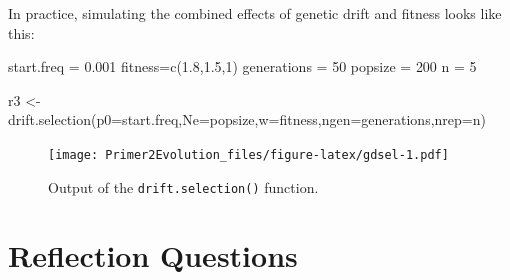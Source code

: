 \documentclass[
]{book}
\newenvironment{Shaded}{\begin{snugshade}}{\end{snugshade}}
\newcommand{\AttributeTok}[1]{\textcolor[rgb]{0.77,0.63,0.00}{#1}}
\newcommand{\DecValTok}[1]{\textcolor[rgb]{0.00,0.00,0.81}{#1}}
\newcommand{\FloatTok}[1]{\textcolor[rgb]{0.00,0.00,0.81}{#1}}
\newcommand{\FunctionTok}[1]{\textcolor[rgb]{0.00,0.00,0.00}{#1}}
\newcommand{\NormalTok}[1]{#1}
\newcommand{\OtherTok}[1]{\textcolor[rgb]{0.56,0.35,0.01}{#1}}
\begin{document}
In practice, simulating the combined effects of genetic drift and fitness looks like this:

\begin{Shaded}
\begin{Highlighting}[]
\NormalTok{start.freq }\OtherTok{=} \FloatTok{0.001}
\NormalTok{fitness}\OtherTok{=}\FunctionTok{c}\NormalTok{(}\FloatTok{1.8}\NormalTok{,}\FloatTok{1.5}\NormalTok{,}\DecValTok{1}\NormalTok{)}
\NormalTok{generations }\OtherTok{=} \DecValTok{50}
\NormalTok{popsize }\OtherTok{=} \DecValTok{200}
\NormalTok{n }\OtherTok{=} \DecValTok{5}

\NormalTok{r3 }\OtherTok{\textless{}{-}} \FunctionTok{drift.selection}\NormalTok{(}\AttributeTok{p0=}\NormalTok{start.freq,}\AttributeTok{Ne=}\NormalTok{popsize,}\AttributeTok{w=}\NormalTok{fitness,}\AttributeTok{ngen=}\NormalTok{generations,}\AttributeTok{nrep=}\NormalTok{n)}
\end{Highlighting}
\end{Shaded}

\begin{figure}
\centering
\texttt{[image: Primer2Evolution\_files/figure-latex/gdsel-1.pdf]}
\caption{\label{fig:gdsel}Output of the \texttt{drift.selection()} function.}
\end{figure}

\hypertarget{reflection-questions-5}{%
\section{Reflection Questions}\label{reflection-questions-5}}
\end{document}
